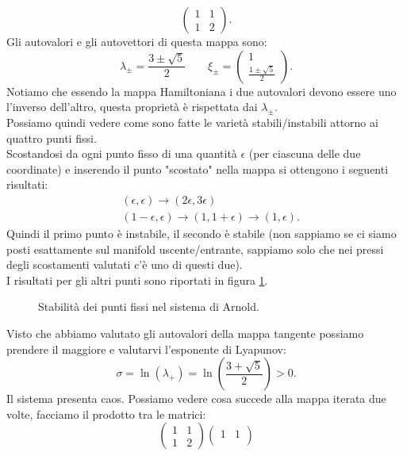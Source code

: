 \begin{exmp}
    \[
        \begin{pmatrix} 
	    1 & 1 \\
	    1 & 2
	\end{pmatrix} 
    .\] 
    Gli autovalori e gli autovettori di questa mappa sono:
    \[
        \lambda_{\pm}= \frac{3 \pm \sqrt{5} }{2} \qquad
	\xi_{\pm} = \begin{pmatrix} 1 \\ \frac{1 \pm \sqrt{5} }{2} \end{pmatrix} 
    .\] 
    Notiamo che essendo la mappa Hamiltoniana i due autovalori devono essere uno l'inverso dell'altro, questa proprietà è rispettata dai $\lambda_{\pm}$.\\
    Possiamo quindi vedere come sono fatte le varietà stabili/instabili attorno ai quattro punti fissi. \\
    Scostandosi da ogni punto fisso di una quantità $\epsilon$ (per ciascuna delle due coordinate) e inserendo il punto "scostato" nella mappa si ottengono i seguenti risultati:
    \[\begin{aligned}
	&(\epsilon,\epsilon)\to (2\epsilon, 3\epsilon)\\
	& (1-\epsilon, \epsilon) \to (1, 1+\epsilon) \to (1, \epsilon)
    .\end{aligned}\]
    Quindi il primo punto è instabile, il secondo è stabile (non sappiamo se ci siamo posti esattamente sul manifold uscente/entrante, sappiamo solo che nei pressi degli scostamenti valutati c'è uno di questi due).\\
    I risultati per gli altri punti sono riportati in figura \ref{fig:21_stab_instab}.
    \begin{figure}[H]
        \centering
	\caption{\scriptsize Stabilità dei punti fissi nel sistema di Arnold.}
        \label{fig:21_stab_instab}
    \end{figure}
    \noindent 
    Visto che abbiamo valutato gli autovalori della mappa tangente possiamo prendere il maggiore e valutarvi l'esponente di Lyapunov:
    \[
	\sigma  = \ln (\lambda_+) = \ln\left(\frac{3 + \sqrt{5} }{2}\right) > 0 
    .\] 
    Il sistema presenta caos.
    Possiamo vedere cosa succede alla mappa iterata due volte, facciamo il prodotto tra le matrici:
    \[
        \begin{pmatrix} 
	    1 & 1 \\
	    1 & 2
	\end{pmatrix} 
        \begin{pmatrix} 
	    1 & 1 \\

\end{pmatrix}\]
\end{exmp}
